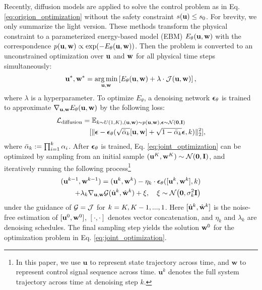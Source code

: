 Recently, diffusion models \citep{wei2024generative, hu2024wavelet} are applied to solve the control problem as in Eq. \ref{eq:origion_optimization} without the safety constraint $s(\mathbf{u})\leq s_0$. For brevity, we only summarize the light version. These methods transform the physical constraint to a parameterized energy-based model (EBM) $E_{\theta}(\mathbf{u},\mathbf{w})$ with the correspondence  $p(\mathbf{u},\mathbf{w})\propto \exp({-E_{\theta}(\mathbf{u},\mathbf{w})})$. Then the problem is converted to an unconstrained optimization over $\mathbf{u}$ and $\mathbf{w}$ for all physical time steps simultaneously:
\vspace{-2pt}
\begin{gather}
\label{eq:joint_optimization}
\mathbf{u}^*, \mathbf{w}^* = \operatorname*{arg\,min}_{\mathbf{u}, \mathbf{w}}\left[E_\theta(\mathbf{u},\mathbf{w}) + \lambda\cdot \mathcal{J}(\mathbf{u},\mathbf{w})\right],
\end{gather}
where $\lambda$ is a hyperparameter. 
To optimize $E_{\theta}$, a denoising network $\bm{\epsilon}_\theta$ is trained to approximate $\nabla_{\mathbf{u},\mathbf{w}} E_\theta(\mathbf{u},\mathbf{w})$ by the following loss:
\begin{align}
\label{eq:training_obj}
\mathcal{L}_\textrm{diffusion}&=\mathbb{E}_{k\sim U(1,K),(\mathbf{u},\mathbf{w})\sim p(\mathbf{u},\mathbf{w}),\bm{\epsilon}\sim \mathcal{N}(\mathbf{0},\mathbf{I})} \notag \\ 
&\quad [\|\mathbf{\bm{\epsilon}} - \bm{\epsilon}_\theta(\sqrt{\bar{\alpha}_k}[\mathbf{u},\mathbf{w}] + \sqrt{1-\bar{\alpha}_k} \bm{\epsilon},k)\|_2^2],
\end{align}
where $\Bar{\alpha}_k:=\prod_{i=1}^k\alpha_i$. After $\bm{\epsilon}_\theta$ is trained, Eq. \ref{eq:joint_optimization} can be optimized by sampling from an initial sample $(\mathbf{u}^K,\mathbf{w}^K)\sim\mathcal{N}(\mathbf{0},\mathbf{I})$, and iteratively running the following process\footnote{In this paper, we use $\mathbf{u}$ to represent state trajectory across time, and $\mathbf{w}$ to represent control signal sequence across time. $\mathbf{u}^k$ denotes the full system trajectory across time at denoising step $k$.}
\begin{align}
\label{eq:1ddpm_inference}
 (\mathbf{u}^{k-1},\mathbf{w}^{k-1}) = (\mathbf{u}^{k},\mathbf{w}^{k}) - \eta_k\cdot\bm{\epsilon}_\theta([\mathbf{u}^{k},\mathbf{w}^{k}],k) \notag \\ 
 +\lambda_k\nabla_{\mathbf{u},\mathbf{w}}\mathcal{G}(\hat{\mathbf{u}}^k,\hat{\mathbf{w}}^k) + \xi, \quad \mathbf{\xi} \sim \mathcal{N} \bigl(\mathbf{0}, \sigma^2_k \mathbf{I} \bigl)
\end{align}
under the guidance of $\mathcal{G}=\mathcal{J}$ for $k=K,K-1,..., 1$. Here 
$[\hat{\mathbf{u}}^k,\hat{\mathbf{w}}^k]$ is the noise-free estimation of $[\mathbf{u}^0, \mathbf{w}^0]$, $[\cdot,\cdot]$ denotes vector concatenation, and $\eta_k$ and $\lambda_k$ are denoising schedules. The final sampling step yields the solution $\mathbf{w}^0$ for the optimization problem in Eq. \ref{eq:joint_optimization}.
